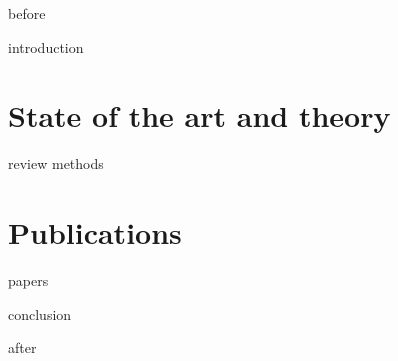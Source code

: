 \documentclass[
	12pt,
	openright,               %
	twoside,                 %
	a4paper,
	french,                  %
	ngerman,                 %
	spanish,                 %
	brazil,                  %
	english,                 %
]{abntex2}
\begin{document}
{before}

\textual{}  %

{introduction}

\part{State of the art and theory}%
\label{part:art-theory}

{review}
{methods}

\part{Publications}%
\label{part:publications}

{papers}


{conclusion}

\postextual{}  %

\printbibliography
{after}
\end{document}
